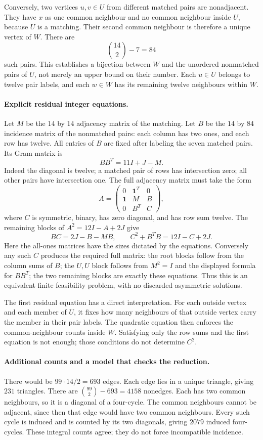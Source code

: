 \documentclass[11pt,a4paper]{article}
\begin{document}
Conversely, two vertices $u,v\in U$ from different matched pairs
are nonadjacent. They have $x$ as one common neighbour and no common
neighbour inside $U$, because $U$ is a matching. Their second common
neighbour is therefore a unique vertex of $W$. There are
\[
                     \binom{14}{2}-7=84
\]
such pairs. This establishes a bijection between $W$ and the unordered
nonmatched pairs of $U$, not merely an upper bound on their number.
Each $u\in U$ belongs to twelve pair labels, and each $w\in W$
has its remaining twelve neighbours within $W$.

\paragraph{Explicit residual integer equations.}
Let $M$ be the $14$ by $14$ adjacency matrix of the matching. Let $B$
be the $14$ by $84$ incidence matrix of the nonmatched pairs: each
column has two ones, and each row has twelve. All entries of $B$
are fixed after labeling the seven matched pairs. Its Gram matrix is
\[
                      BB^T=11I+J-M.
\]
Indeed the diagonal is twelve; a matched pair of rows has intersection
zero; all other pairs have intersection one. The full adjacency matrix
must take the form
\[
 A=\begin{pmatrix}
 0&\mathbf1^T&0\\
 \mathbf1&M&B\\
 0&B^T&C
 \end{pmatrix},
\]
where $C$ is symmetric, binary, has zero diagonal, and has row sum twelve.
The remaining blocks of $A^2=12I-A+2J$ give
\[
                 BC=2J-B-MB,
 \qquad C^2+B^TB=12I-C+2J.
\]
Here the all-ones matrices have the sizes dictated by the equations.
Conversely any such $C$ produces the required full matrix: the
root blocks follow from the column sums of $B$; the $U,U$ block
follows from $M^2=I$ and the displayed formula for $BB^T$; the
two remaining blocks are exactly these equations. Thus this is an
equivalent finite feasibility problem, with no discarded asymmetric
solutions.

The first residual equation has a direct interpretation. For each
outside vertex and each member of $U$, it fixes how many neighbours
of that outside vertex carry the member in their pair labels. The
quadratic equation then enforces the common-neighbour counts inside
$W$. Satisfying only the row sums and the first equation is not enough;
those conditions do not determine $C^2$.

\paragraph{Additional counts and a model that checks the reduction.}
There would be $99\cdot14/2=693$ edges. Each edge lies in a unique
triangle, giving $231$ triangles. There are $\binom{99}{2}-693=4158$
nonedges. Each has two common neighbours, so it is a diagonal of a
four-cycle. The common neighbours cannot be adjacent, since then that
edge would have two common neighbours. Every such cycle is induced
and is counted by its two diagonals, giving $2079$ induced four-cycles.
These integral counts agree; they do not force incompatible incidence.
\end{document}
